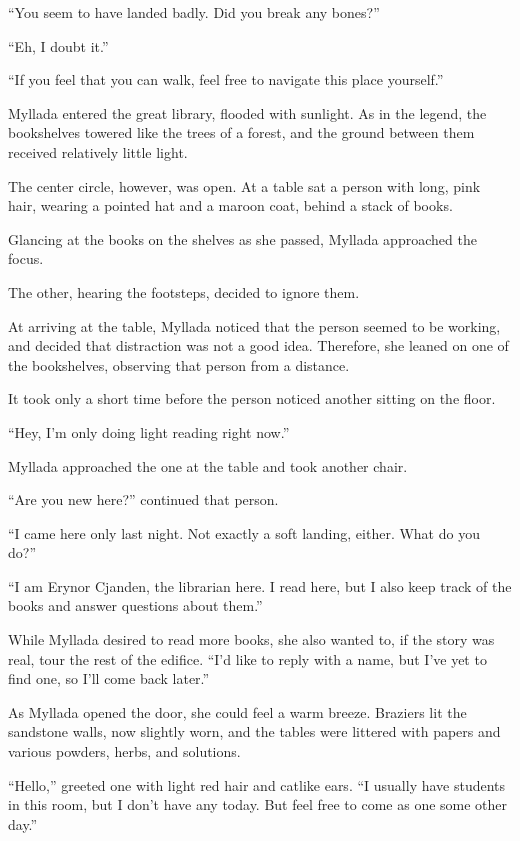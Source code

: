 ``You seem to have landed badly. Did you break any bones?''

``Eh, I doubt it.''

``If you feel that you can walk, feel free to navigate this place yourself.''

\centeredstars

Myllada entered the great library, flooded with sunlight. As in the legend, the bookshelves towered like the trees of a forest, and the ground between them received relatively little light.

The center circle, however, was open. At a table sat a person with long, pink hair, wearing a pointed hat and a maroon coat, behind a stack of books.

Glancing at the books on the shelves as she passed, Myllada approached the focus.

The other, hearing the footsteps, decided to ignore them.

At arriving at the table, Myllada noticed that the person seemed to be working, and decided that distraction was not a good idea. Therefore, she leaned on one of the bookshelves, observing that person from a distance.

It took only a short time before the person noticed another sitting on the floor.

``Hey, I'm only doing light reading right now.''

Myllada approached the one at the table and took another chair.

``Are you new here?'' continued that person.

``I came here only last night. Not exactly a soft landing, either. What do you do?''

``I am Erynor Cjanden, the librarian here. I read here, but I also keep track of the books and answer questions about them.''

While Myllada desired to read more books, she also wanted to, if the story was real, tour the rest of the edifice. ``I'd like to reply with a name, but I've yet to find one, so I'll come back later.''

\centeredstars

As Myllada opened the door, she could feel a warm breeze. Braziers lit the sandstone walls, now slightly worn, and the tables were littered with papers and various powders, herbs, and solutions.

``Hello,'' greeted one with light red hair and catlike ears. ``I usually have students in this room, but I don't have any today. But feel free to come as one some other day.''

